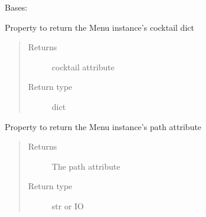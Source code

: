 \documentclass[letterpaper,10pt,english]{sphinxmanual}
\begin{document}
\begin{fulllineitems}
\label{\detokenize{polo.utils:polo.utils.io_utils.Menu}}
Bases: 

\begin{fulllineitems}
\label{\detokenize{polo.utils:polo.utils.io_utils.Menu.cocktails}}
Property to return the Menu instance’s cocktail dict
\begin{quote}\begin{description}
\item[{Returns}] \leavevmode
cocktail attribute

\item[{Return type}] \leavevmode
dict

\end{description}\end{quote}

\end{fulllineitems}


\begin{fulllineitems}
\label{\detokenize{polo.utils:polo.utils.io_utils.Menu.path}}
Property to return the Menu instance’s path attribute
\begin{quote}\begin{description}
\item[{Returns}] \leavevmode
The path attribute

\item[{Return type}] \leavevmode
str or IO

\end{description}\end{quote}

\end{fulllineitems}


\end{fulllineitems}
\end{document}
